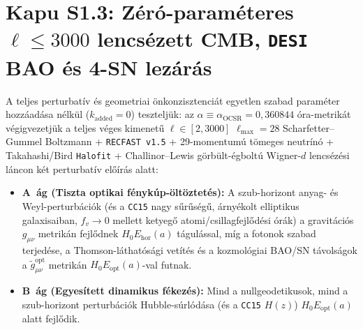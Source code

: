 \documentclass[11pt,a4paper]{article}
\begin{document}
\section{\texorpdfstring{Kapu S1.3: Zéró-paraméteres $\ell \le 3000$ lencsézett CMB, \texttt{DESI} BAO és 4-SN lezárás}{Kapu S1.3: Zero-parameteres l <= 3000 lencsezett CMB, DESI BAO es 4-SN lezaras}}
A teljes perturbatív és geometriai önkonzisztenciát egyetlen szabad paraméter hozzáadása nélkül ($k_{\mathrm{added}} = 0$) teszteljük: az $\alpha \equiv \alpha_{\mathrm{OCSR}} = 0{,}360844$ óra-metrikát végigvezetjük a teljes véges kimenetű $\ell \in [2, 3000]$ $\ell_{\max}=28$ Scharfetter--Gummel Boltzmann + \texttt{RECFAST v1.5} + 29-momentumú tömeges neutrínó + Takahashi/Bird \texttt{Halofit} + Challinor--Lewis görbült-égboltú Wigner-$d$ lencsézési láncon két perturbatív előírás alatt:
\begin{itemize}
    \item \textbf{A~ág (Tiszta optikai fénykúp-öltöztetés):} A szub-horizont anyag- és Weyl-perturbációk (és a \texttt{CC15} nagy sűrűségű, árnyékolt elliptikus galaxisaiban, $f_v \to 0$ mellett ketyegő atomi/csillagfejlődési órák) a gravitációs $g_{\mu\nu}$ metrikán fejlődnek $H_0 E_{\mathrm{hor}}(a)$ tágulással, míg a fotonok szabad terjedése, a Thomson-láthatósági vetítés és a kozmológiai BAO/SN távolságok a $\tilde{g}_{\mu\nu}^{\mathrm{opt}}$ metrikán $H_0 E_{\mathrm{opt}}(a)$-val futnak.
    \item \textbf{B~ág (Egyesített dinamikus fékezés):} Mind a nullgeodetikusok, mind a szub-horizont perturbációk Hubble-súrlódása (és a \texttt{CC15} $H(z)$) $H_0 E_{\mathrm{opt}}(a)$ alatt fejlődik.
\end{itemize}
\end{document}
